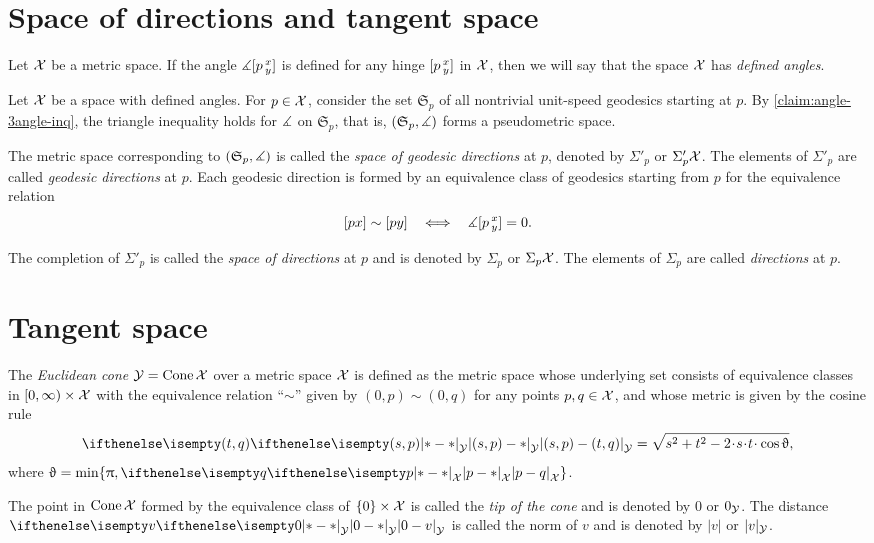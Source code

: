 \section{Space of directions and tangent space}
\label{sec:tangent-space+directions}

Let $\mathcal{X}$ be a metric space.
If the angle $\measuredangle[p\,{}^{x}_{y}]$ is defined for any hinge $[p\,{}^{x}_{y}]$ in $\mathcal{X}$,
then we will say that the space $\mathcal{X}$ has \emph{defined angles}.

 
Let $\mathcal{X}$ be a space with defined angles. For $p\in \spc{X}$,
consider the set $\mathfrak{S}_p$ 
of all nontrivial unit-speed geodesics starting at $p$.
By \ref{claim:angle-3angle-inq}, the triangle inequality holds for $\measuredangle$ on $\mathfrak{S}_p$,
that is, $(\mathfrak{S}_p,\measuredangle)$ 
forms a pseudometric space.

The metric space corresponding to  $(\mathfrak{S}_p,\measuredangle)$ is called the \emph{space of geodesic directions} at $p$, denoted by $\Sigma'_p$ or $\Sigma'_p\mathcal{X}$.
The elements of $\Sigma'_p$ are called \emph{geodesic directions} at $p$.
Each geodesic direction is formed by an equivalence class of geodesics starting from $p$ 
for the equivalence relation 
\[[px]\sim[py]\ \ \iff\ \ \mangle\hinge pxy=0.\]



The completion of $\Sigma'_p$ is called the \emph{space of directions} at $p$ and is denoted by $\Sigma_p$ or $\Sigma_p\mathcal{X}$.
The elements of $\Sigma_p$ are called \emph{directions} at $p$.

\section{Tangent space}

The \emph{
Euclidean cone} $\mathcal{Y}=\mathop{\rm Cone}\nolimits\mathcal{X}$ 
over a metric space $\mathcal{X}$
is defined as the metric space whose underlying set consists of
equivalence classes in
$[0,\infty)\times \spc{X}$ with the equivalence relation ``$\sim$'' given by $(0,p)\sim (0,q)$ for any points $p,q\in\spc{X}$,
and whose metric is given by the cosine rule
\[
\dist{(s,p)}{(t,q)}{\spc{Y}} 
=
\sqrt{s^2+t^2-2\cdot s\cdot t\cdot \cos\theta},
\]
where $\theta= \min\{\pi, \dist{p}{q}{\spc{X}}\}$.

The point in  $\mathop{\rm Cone}\nolimits{\mathcal{X}}$ formed by the equivalence class of $\{0\}\times\spc{X}$ is called the \emph{tip of the cone} and is denoted by $0$ or $0_{\mathcal{Y}}$.
The distance $\dist{0}{v}{\spc{Y}}$ is called the norm of $v$ and is denoted by $|v|$ or $|v|_{\mathcal{Y}}$.


